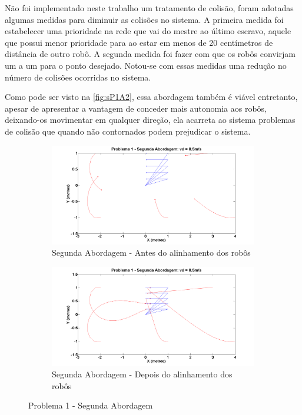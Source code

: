 Não foi implementado neste trabalho um tratamento de colisão, foram adotadas algumas medidas para diminuir as colisões no sistema. A primeira medida foi estabelecer uma prioridade na rede que vai do mestre ao último escravo, aquele que possui menor prioridade para ao estar em menos de 20 centímetros de distância de outro robô. A segunda medida foi fazer com que os robôs convirjam um a um para o ponto desejado. Notou-se com essas medidas uma redução no número de colisões ocorridas no sistema. 

Como pode ser visto na \autoref{fig:sP1A2}, essa abordagem também é viável entretanto, apesar de apresentar a vantagem de conceder mais autonomia aos robôs, deixando-os movimentar em qualquer direção, ela acarreta ao sistema problemas de colisão que quando não contornados podem prejudicar o sistema.

\begin{figure}[!htb]
	\centering
	\begin{subfigure}{1.0\textwidth}
		\centering
		\includegraphics[width=.9\linewidth]{./04-figuras/Simulacoes/Problema1-Abordagem1/P1A2Inicio}
		\caption{Segunda Abordagem - Antes do alinhamento dos robôs}
		\label{fig:P1A2Ini}
	\end{subfigure}
	\begin{subfigure}{1.0\textwidth}
		\centering
		\includegraphics[width=.9\linewidth]{./04-figuras/Simulacoes/Problema1-Abordagem1/P1A2Fim}
		\caption{Segunda Abordagem - Depois do alinhamento dos robôs}
		\label{fig:P1A2Fim}
	\end{subfigure}
	\caption{Problema 1 - Segunda Abordagem}
	\label{fig:sP1A2}
\end{figure}

